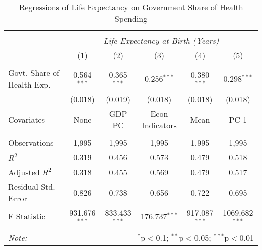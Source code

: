 \begin{table}[!htbp] \centering
  \caption{Regressions of Life Expectancy on Government Share of Health Spending \label{main_regs}}
\begin{tabular}{@{\extracolsep{5pt}}lccccc}
\\[-1.8ex]\hline
\hline \\[-1.8ex]
& \multicolumn{5}{c}{\textit{Life Expectancy at Birth (Years)}} \
\cr \
\\[-1.8ex] & (1) & (2) & (3) & (4) & (5) \\
\hline \\[-1.8ex]
 Govt. Share of Health Exp. & 0.564$^{***}$ & 0.365$^{***}$ & 0.256$^{***}$ & 0.380$^{***}$ & 0.298$^{***}$ \\
  & (0.018) & (0.019) & (0.018) & (0.018) & (0.018) \\
 Covariates & None & GDP PC & Econ Indicators & Mean & PC 1 \\
\hline \\[-1.8ex]
 Observations & 1,995 & 1,995 & 1,995 & 1,995 & 1,995 \\
 $R^2$ & 0.319 & 0.456 & 0.573 & 0.479 & 0.518 \\
 Adjusted $R^2$ & 0.318 & 0.455 & 0.569 & 0.479 & 0.517 \\
 Residual Std. Error & 0.826 & 0.738 & 0.656 & 0.722 & 0.695  \\
 F Statistic & 931.676$^{***}$  & 833.433$^{***}$  & 176.737$^{***}$  & 917.087$^{***}$  & 1069.682$^{***}$  \\
\hline
\hline \\[-1.8ex]
\textit{Note:} & \multicolumn{5}{r}{$^{*}$p$<$0.1; $^{**}$p$<$0.05; $^{***}$p$<$0.01} \\
\end{tabular}
\end{table}